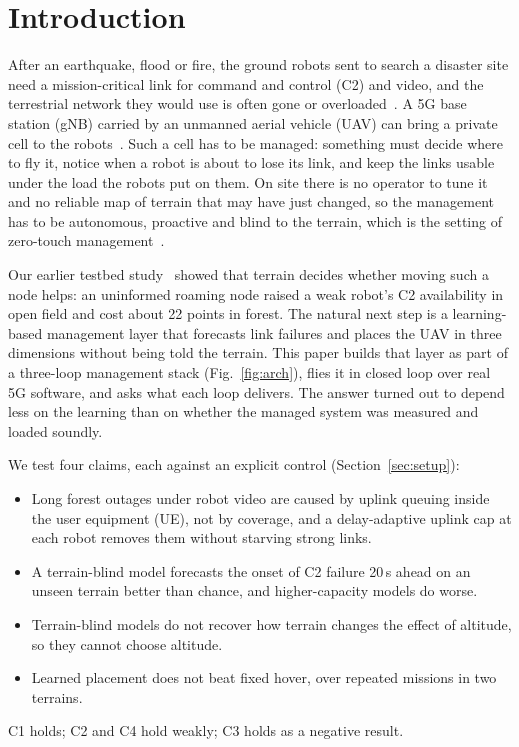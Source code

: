\section{Introduction}
\label{sec:intro}

After an earthquake, flood or fire, the ground robots sent to search a
disaster site need a mission-critical link for command and control (C2) and
video, and the terrestrial network they would use is often gone or
overloaded~\cite{murphy2014disaster}. A 5G base station (gNB) carried by an
unmanned aerial vehicle (UAV) can bring a private cell to the
robots~\cite{zeng2016wireless,mozaffari2019tutorial}. Such a cell has to be
managed: something must decide where to fly it, notice when a robot is about
to lose its link, and keep the links usable under the load the robots put on
them. On site there is no operator to tune it and no reliable map of terrain
that may have just changed, so the management has to be autonomous, proactive
and blind to the terrain, which is the setting of zero-touch
management~\cite{coronado2022zsm}.

Our earlier testbed study~\cite{makhubela2026satnac} showed that terrain decides
whether moving such a node helps: an uninformed roaming node raised a weak
robot's C2 availability in open field and cost about 22 points in forest. The
natural next step is a learning-based management layer that forecasts link
failures and places the UAV in three dimensions without being told the terrain.
This paper builds that layer as part of a three-loop management stack
(Fig.~\ref{fig:arch}), flies it in closed loop over real 5G software, and asks
what each loop delivers. The answer turned out to depend less on the learning
than on whether the managed system was measured and loaded soundly.

We test four claims, each against an explicit control (Section~\ref{sec:setup}):
\begin{itemize}
\item[\textbf{C1}] Long forest outages under robot video are caused by uplink
queuing inside the user equipment (UE), not by coverage, and a delay-adaptive
uplink cap at each robot removes them without starving strong links.
\item[\textbf{C2}] A terrain-blind model forecasts the onset of C2 failure
20\,s ahead on an unseen terrain better than chance, and higher-capacity models
do worse.
\item[\textbf{C3}] Terrain-blind models do not recover how terrain changes the
effect of altitude, so they cannot choose altitude.
\item[\textbf{C4}] Learned placement does not beat fixed hover, over repeated
missions in two terrains.
\end{itemize}
C1 holds; C2 and C4 hold weakly; C3 holds as a negative result.

